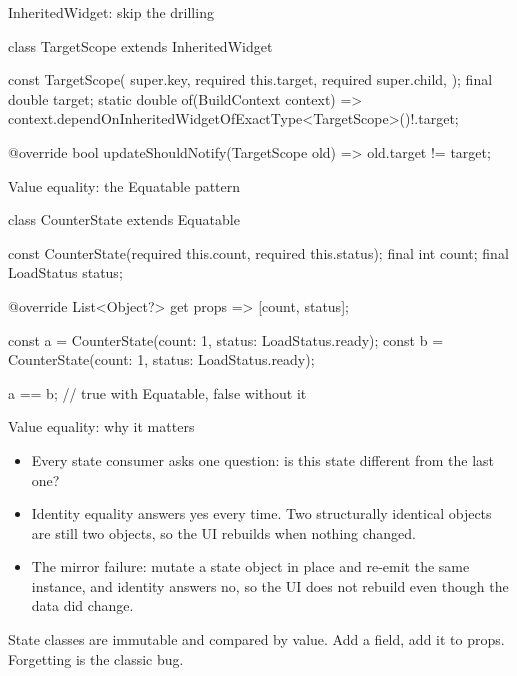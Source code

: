 \documentclass[10pt,aspectratio=169,t]{beamer}
\begin{document}
\begin{frame}[fragile,eyebrow=Sharing state]{InheritedWidget: skip the drilling}
\begin{dart}
class TargetScope extends InheritedWidget {
  const TargetScope({
    super.key,
    required this.target,
    required super.child,
  });
  final double target;
  static double of(BuildContext context) =>
      context.dependOnInheritedWidgetOfExactType<TargetScope>()!.target;

  @override
  bool updateShouldNotify(TargetScope old) => old.target != target;
}
\end{dart}
\end{frame}

\begin{frame}[fragile,eyebrow=Sharing state]{Value equality: the Equatable pattern}
\begin{dart}
class CounterState extends Equatable {
  const CounterState({required this.count, required this.status});
  final int count;
  final LoadStatus status;

  @override
  List<Object?> get props => [count, status];
}

const a = CounterState(count: 1, status: LoadStatus.ready);
const b = CounterState(count: 1, status: LoadStatus.ready);

a == b;   // true with Equatable, false without it
\end{dart}
\end{frame}

\begin{frame}[eyebrow=Sharing state]{Value equality: why it matters}
  \vskip 3mm
  \begin{itemize}
    \item Every state consumer asks one question: is this state different from the last one?
    \item Identity equality answers yes every time. Two structurally identical objects are still two objects, so the UI rebuilds when nothing changed.
    \item The mirror failure: mutate a state object in place and re-emit the same instance, and identity answers no, so the UI does not rebuild even though the data did change.
  \end{itemize}
  \vskip 3mm
  \begin{takeaway}{State classes are immutable and compared by value.}
    Add a field, add it to props. Forgetting is the classic bug.
  \end{takeaway}
\end{frame}
\end{document}
